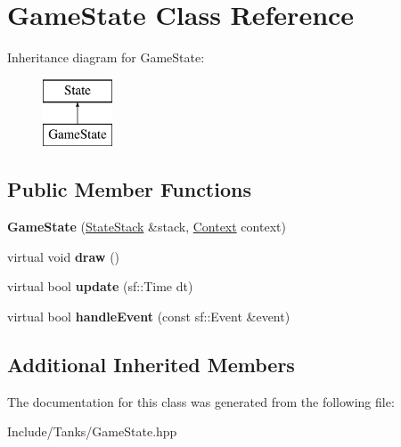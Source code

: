 \hypertarget{class_game_state}{}\section{Game\+State Class Reference}
\label{class_game_state}
Inheritance diagram for Game\+State\+:\begin{figure}[H]
\begin{center}
\leavevmode
\includegraphics[height=2.000000cm]{class_game_state}
\end{center}
\end{figure}
\subsection*{Public Member Functions}
\begin{DoxyCompactItemize}
\item 
\hypertarget{class_game_state_aeb2e2598754640c694b989311b1aebfe}{}{\bfseries Game\+State} (\hyperlink{class_state_stack}{State\+Stack} \&stack, \hyperlink{struct_state_1_1_context}{Context} context)\label{class_game_state_aeb2e2598754640c694b989311b1aebfe}

\item 
\hypertarget{class_game_state_adf753ecc90e0b309c849b117036e619e}{}virtual void {\bfseries draw} ()\label{class_game_state_adf753ecc90e0b309c849b117036e619e}

\item 
\hypertarget{class_game_state_a0b13d7c27239f0cfc7260955a960d045}{}virtual bool {\bfseries update} (sf\+::\+Time dt)\label{class_game_state_a0b13d7c27239f0cfc7260955a960d045}

\item 
\hypertarget{class_game_state_a063c526c647305d7bac9ae95b3f9078f}{}virtual bool {\bfseries handle\+Event} (const sf\+::\+Event \&event)\label{class_game_state_a063c526c647305d7bac9ae95b3f9078f}

\end{DoxyCompactItemize}
\subsection*{Additional Inherited Members}


The documentation for this class was generated from the following file\+:\begin{DoxyCompactItemize}
\item 
Include/\+Tanks/Game\+State.\+hpp\end{DoxyCompactItemize}
